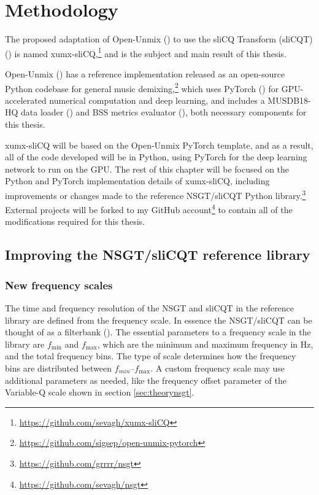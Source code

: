 \documentclass[report.tex]{subfiles}
\begin{document}
\section{Methodology}
\label{sec:methodology}

The proposed adaptation of Open-Unmix (\cite{umx}) to use the sliCQ Transform (sliCQT) (\cite{invertiblecqt, slicq}) is named xumx-sliCQ,\footnote{\url{https://github.com/sevagh/xumx-sliCQ}} and is the subject and main result of this thesis.

Open-Unmix (\cite{umx}) has a reference implementation released as an open-source Python codebase for general music demixing,\footnote{\url{https://github.com/sigsep/open-unmix-pytorch}} which uses PyTorch (\cite{pytorch}) for GPU-accelerated numerical computation and deep learning, and includes a MUSDB18-HQ data loader (\cite{musdb18hq}) and BSS metrics evaluator (\cite{bss}), both necessary components for this thesis.

xumx-sliCQ will be based on the Open-Unmix PyTorch template, and as a result, all of the code developed will be in Python, using PyTorch for the deep learning network to run on the GPU. The rest of this chapter will be focused on the Python and PyTorch implementation details of xumx-sliCQ, including improvements or changes made to the reference NSGT/sliCQT Python library.\footnote{\url{https://github.com/grrrr/nsgt}} External projects will be forked to my GitHub account\footnote{\url{https://github.com/sevagh/nsgt}} to contain all of the modifications required for this thesis.

\subsection{Improving the NSGT/sliCQT reference library}
\label{sec:improvelib}

\subsubsection{New frequency scales}
\label{sec:freqscales}

The time and frequency resolution of the NSGT and sliCQT in the reference library are defined from the frequency scale. In essence the NSGT/sliCQT can be thought of as a filterbank (\cite{variableq1}). The essential parameters to a frequency scale in the library are $f_{\text{min}}$ and $f_{\text{max}}$, which are the minimum and maximum frequency in Hz, and the total frequency bins. The type of scale determines how the frequency bins are distributed between $f_{min}$--$f_{\text{max}}$. A custom frequency scale may use additional parameters as needed, like the frequency offset parameter of the Variable-Q scale shown in section \ref{sec:theorynsgt}.
\end{document}
